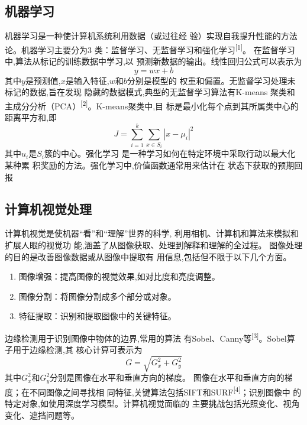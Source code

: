\documentclass[a4paper]{article}
\theoremstyle{definition}
\theoremstyle{plain}
\theoremstyle{remark}
\begin{document}
\subsection{机器学习}
机器学习是一种使计算机系统利用数据（或过往经
验）实现自我提升性能的方法论。机器学习主要分为3
类：监督学习、无监督学习和强化学习\textsuperscript{[1]}。
在监督学习中,算法从标记的训练数据中学习,以
预测新数据的输出。线性回归公式可以表示为
\begin{equation}
	y = wx + b
	\end{equation}
其中$\textit{y}$是预测值,$\textit{x}$是输入特征,$\textit{w}$和$\textit{b}$分别是模型的
权重和偏置。无监督学习处理未标记的数据,旨在发现
隐藏的数据模式,典型的无监督学习算法有K-means
聚类和主成分分析（PCA）\textsuperscript{[2]}。K-means聚类中,目
标是最小化每个点到其所属类中心的距离平方和,即
\begin{equation}
	J = \sum_{i=1}^{k} \sum_{x \in S_i} |x - \mu_i|^2
	\end{equation}
其中$u_i$是$S_i$簇的中心。强化学习
是一种学习如何在特定环境中采取行动以最大化某种累
积奖励的方法。强化学习中,价值函数通常用来估计在
状态下获取的预期回报
\subsection{计算机视觉处理}
计算机视觉是使机器“看”和“理解”世界的科学,
利用相机、计算机和算法来模拟和扩展人眼的视觉功
能,涵盖了从图像获取、处理到解释和理解的全过程。
图像处理的目的是改善图像数据或从图像中提取有
用信息,包括但不限于以下几个方面。
\begin{enumerate}
	\item 图像增强：提高图像的视觉效果,如对比度和亮度调整。
	\item 图像分割：将图像分割成多个部分或对象。
	\item 特征提取：识别和提取图像中的关键特征。
	\end{enumerate}
边缘检测用于识别图像中物体的边界,常用的算法
有Sobel、Canny等\textsuperscript{[3]}。Sobel算子用于边缘检测,其
核心计算可表示为
\begin{equation}
	G = \sqrt{G_x^2 + G_y^2}
	\end{equation}
其中$G_x^2$和$G_y^2$分别是图像在水平和垂直方向的梯度。
图像在水平和垂直方向的梯度；在不同图像之间寻找相
同特征,关键算法包括SIFT和SURF\textsuperscript{[4]}；识别图像中
的特定对象,如使用深度学习模型。计算机视觉面临的
主要挑战包括光照变化、视角变化、遮挡问题等。
\end{document}
